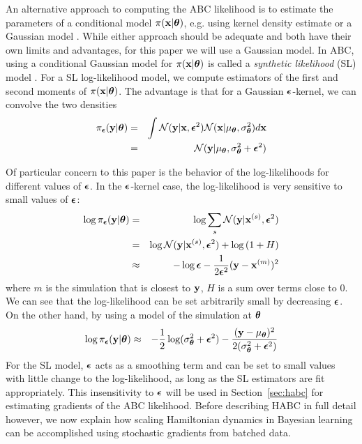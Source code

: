 \documentclass[]{article}
\begin{document}
An alternative approach to computing the ABC likelihood is to estimate the parameters of a conditional model  $\pi({\bf x}|{\bm \theta})$, e.g. using kernel density estimate \cite{TurnerGenLik2014} or a Gaussian model \cite{wood2010statistical}.  While either approach should be adequate and both have their own limits and advantages, for this paper we will use a Gaussian model.  In ABC, using a conditional Gaussian model for  $\pi({\bf x}|{\bm \theta})$ is called a {\em synthetic likelihood} (SL) model \cite{wood2010statistical}.  For a SL log-likelihood model, we compute estimators of the first and second moments of $\pi({\bf x}|{\bm \theta})$.  The advantage is that for a Gaussian ${\bm {\epsilon}}$-kernel, we can convolve the two densities   
\begin{eqnarray}
  \pi_{{\bm {\epsilon}}}( {\bf y} | {\bm \theta} ) & = & \int \mathcal{N}( {\bf y} | {\bf x}, {\bm {\epsilon}}^2 ) \mathcal{N}( {\bf x} | 
  \mu_{{\bm \theta}}, \sigma^2_{{\bm \theta}} ) d{\bf x} \\
                          & = & \mathcal{N}( {\bf y} | \mu_{{\bm \theta}}, \sigma^2_{{\bm \theta}} + {\bm {\epsilon}}^2 )
\end{eqnarray}

Of particular concern to this paper is the behavior of the log-likelihoods for different values of ${\bm {\epsilon}}$.  In the ${\bm {\epsilon}}$-kernel case, the log-likelihood is very sensitive to small values of ${\bm {\epsilon}}$:
\begin{eqnarray}
  \log \pi_{{\bm {\epsilon}}}( {\bf y} | {\bm \theta} ) & = & \log \sum_s \mathcal{N}( {\bf y} | {\bf x}^{(s)}, {\bm {\epsilon}}^2 ) \\
                          & = & \log \mathcal{N}( {\bf y} | {\bf x}^{(s)}, {\bm {\epsilon}}^2 ) + \log\left( 1 + H \right) \\
                          & \approx & -\log {\bm {\epsilon}} -\frac{1}{2 {\bm {\epsilon}}^2} ( {\bf y} - {\bf x}^{(m)} )^2 
\end{eqnarray}
where $m$ is the simulation that is closest to ${\bf y}$, $H$ is a sum over terms close to $0$. We can see that the log-likelihood can be set arbitrarily small by decreasing ${\bm {\epsilon}}$.  On the other hand, by using a model of the simulation at ${\bm \theta}$
\begin{eqnarray}
 \log \pi_{{\bm {\epsilon}}}( {\bf y} | {\bm \theta} ) & \approx & -\frac{1}{2} \log (\sigma^2_{{\bm \theta}} + {\bm {\epsilon}}^2 ) -\frac{( {\bf y} - \mu_{{\bm \theta}} )^2 }{2 (\sigma^2_{{\bm \theta}} + {\bm {\epsilon}}^2 )} 
\end{eqnarray}
 For the SL model, ${\bm {\epsilon}}$ acts as a smoothing term and can be set to small values with little change to the log-likelihood, as long as the SL estimators are fit appropriately.  This insensitivity to ${\bm {\epsilon}}$ will be used in Section~\ref{sec:habc} for estimating gradients of the ABC likelihood.  Before describing HABC in full detail however, we now explain how scaling Hamiltonian dynamics in Bayesian learning can be accomplished using stochastic gradients from batched data.
 
\end{document}
